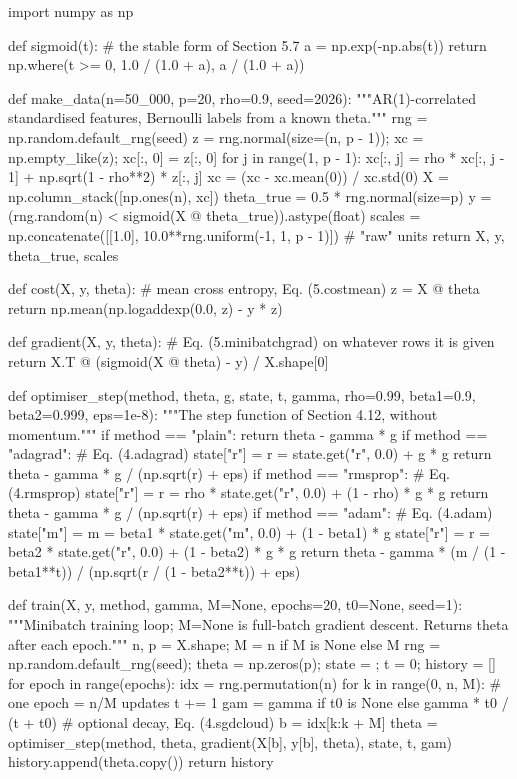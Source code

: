 \begin{Python}{}
import numpy as np

def sigmoid(t):                                   # the stable form of Section 5.7
    a = np.exp(-np.abs(t))
    return np.where(t >= 0, 1.0 / (1.0 + a), a / (1.0 + a))

def make_data(n=50_000, p=20, rho=0.9, seed=2026):
    """AR(1)-correlated standardised features, Bernoulli labels from a known theta."""
    rng = np.random.default_rng(seed)
    z = rng.normal(size=(n, p - 1)); xc = np.empty_like(z); xc[:, 0] = z[:, 0]
    for j in range(1, p - 1):
        xc[:, j] = rho * xc[:, j - 1] + np.sqrt(1 - rho**2) * z[:, j]
    xc = (xc - xc.mean(0)) / xc.std(0)
    X = np.column_stack([np.ones(n), xc])
    theta_true = 0.5 * rng.normal(size=p)
    y = (rng.random(n) < sigmoid(X @ theta_true)).astype(float)
    scales = np.concatenate([[1.0], 10.0**rng.uniform(-1, 1, p - 1)])   # "raw" units
    return X, y, theta_true, scales

def cost(X, y, theta):                            # mean cross entropy, Eq. (5.costmean)
    z = X @ theta
    return np.mean(np.logaddexp(0.0, z) - y * z)

def gradient(X, y, theta):                        # Eq. (5.minibatchgrad) on whatever rows it is given
    return X.T @ (sigmoid(X @ theta) - y) / X.shape[0]

def optimiser_step(method, theta, g, state, t, gamma, rho=0.99,
                   beta1=0.9, beta2=0.999, eps=1e-8):
    """The step function of Section 4.12, without momentum."""
    if method == "plain":
        return theta - gamma * g
    if method == "adagrad":                                             # Eq. (4.adagrad)
        state["r"] = r = state.get("r", 0.0) + g * g
        return theta - gamma * g / (np.sqrt(r) + eps)
    if method == "rmsprop":                                             # Eq. (4.rmsprop)
        state["r"] = r = rho * state.get("r", 0.0) + (1 - rho) * g * g
        return theta - gamma * g / (np.sqrt(r) + eps)
    if method == "adam":                                                # Eq. (4.adam)
        state["m"] = m = beta1 * state.get("m", 0.0) + (1 - beta1) * g
        state["r"] = r = beta2 * state.get("r", 0.0) + (1 - beta2) * g * g
        return theta - gamma * (m / (1 - beta1**t)) / (np.sqrt(r / (1 - beta2**t)) + eps)

def train(X, y, method, gamma, M=None, epochs=20, t0=None, seed=1):
    """Minibatch training loop; M=None is full-batch gradient descent.  Returns theta after each epoch."""
    n, p = X.shape; M = n if M is None else M
    rng = np.random.default_rng(seed); theta = np.zeros(p); state = {}; t = 0; history = []
    for epoch in range(epochs):
        idx = rng.permutation(n)
        for k in range(0, n, M):                                        # one epoch = n/M updates
            t += 1
            gam = gamma if t0 is None else gamma * t0 / (t + t0)        # optional decay, Eq. (4.sgdcloud)
            b = idx[k:k + M]
            theta = optimiser_step(method, theta, gradient(X[b], y[b], theta), state, t, gam)
        history.append(theta.copy())
    return history


\end{Python}
